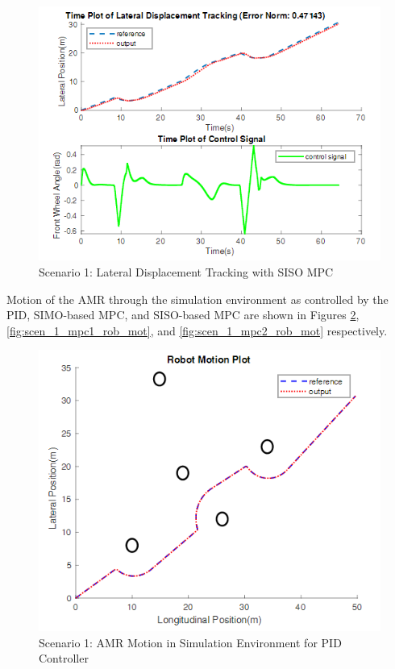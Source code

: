 \documentclass[a4paper, twocolumn]{article}
\begin{document}
\begin{figure}
    \centering
    \includegraphics[scale=0.40]{img/scenario_1/mpc1-lat_tracking.png}
    \caption{Scenario 1: Lateral Displacement Tracking with SISO MPC}
    \label{fig:scen_1_mpc1_lat}
\end{figure}

Motion of the AMR through the simulation environment as controlled by the PID, SIMO-based MPC, and SISO-based MPC are shown in Figures \ref{fig:scen_1_pid_rob_mot}, \ref{fig:scen_1_mpc1_rob_mot}, and \ref{fig:scen_1_mpc2_rob_mot} respectively. 

\begin{figure}
    \centering
    \includegraphics[scale=0.40]{img/scenario_1/pid-robot_motion.png}
    \caption{Scenario 1: AMR Motion in Simulation Environment for PID Controller}
    \label{fig:scen_1_pid_rob_mot}
\end{figure}
\end{document}
